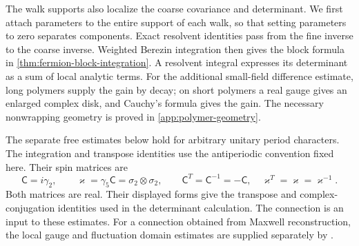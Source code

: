 The walk supports also localize the coarse covariance and determinant.
We first attach parameters to the entire support of each walk, so
that setting parameters to zero separates components. Exact resolvent
identities pass from the fine inverse to the coarse inverse.
Weighted Berezin integration then gives the block formula in
\cref{thm:fermion-block-integration}. A resolvent integral expresses
its determinant as a sum of local analytic terms. For the additional
small-field difference estimate, long polymers supply the gain by
decay; on short polymers a real gauge gives an enlarged complex disk,
and Cauchy's formula gives the gain. The necessary nonwrapping
geometry is proved in \cref{app:polymer-geometry}.

The separate free estimates below hold for arbitrary unitary period
characters. The integration and transpose identities use the
antiperiodic convention fixed here. Their spin matrices are
\[
 \mathsf C=i\gamma_2,\qquad
 \varkappa=\gamma_5\mathsf C=\sigma_2\otimes\sigma_2,
 \qquad
 \mathsf C^T=\mathsf C^{-1}=-\mathsf C,\quad
 \varkappa^T=\varkappa=\varkappa^{-1}.
\]
Both matrices are real. Their displayed forms give the transpose and
complex-conjugation identities used in the determinant calculation.
The connection is an input to these estimates. For a connection
obtained from Maxwell reconstruction, the local gauge and fluctuation
domain estimates are supplied separately by
\cite[Theorems~A and~B]{MaxwellBlockManuscript}.
